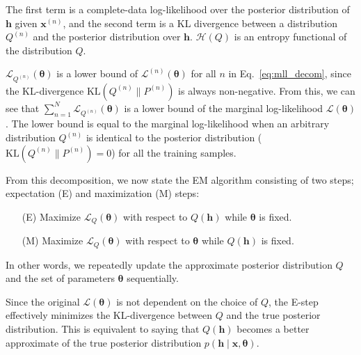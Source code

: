 \documentclass[dissertation,nocontribution]{aaltoseries}
\newcommand{\vect}[1]{\mathbf{#1}}
\newcommand{\vects}[1]{\boldsymbol{#1}}
\newcommand{\vh}[0]{\vect{h}}
\newcommand{\vx}[0]{\vect{x}}
\newcommand{\TT}[0]{{\vects{\theta}}}
\newcommand{\LL}[0]{\mathcal{L}}
\newcommand{\HH}[0]{\mathcal{H}}
\newcommand{\KL}[0]{\text{KL}}
\begin{document}
The first term is a complete-data log-likelihood over the
posterior distribution of $\vh$ given $\vx^{(n)}$, and the
second term is a KL divergence between a distribution
$Q^{(n)}$ and the posterior distribution over $\vh$.
$\HH(Q)$ is an entropy functional of the distribution $Q$.

$\LL_{Q^{(n)}}(\TT)$ is a lower bound
of $\LL^{(n)}(\TT)$ for all $n$ in Eq.~\eqref{eq:mll_decom},
since the KL-divergence $\KL(Q^{(n)}\| P^{(n)})$ is always
non-negative. From this, 
we can see that
$\sum_{n=1}^N
\LL_{Q^{(n)}}(\TT)$ is a lower bound of the marginal
log-likelihood $\LL(\TT)$. The lower bound is
equal to the marginal log-likelihood when an arbitrary
distribution $Q^{(n)}$ is identical to the posterior distribution
($\KL(Q^{(n)} \| P^{(n)}) = 0$) for all the training
samples.

From this decomposition, we now state the EM algorithm
consisting of two steps; expectation (E) and maximization
(M) steps:
\begin{enumerate}
    \itemsep 0em
    \item[(E)] Maximize $\LL_Q(\TT)$ with respect to $Q(\vh)$
        while $\TT$ is fixed.
    \item[(M)] Maximize $\LL_Q(\TT)$ with respect to $\TT$
        while $Q(\vh)$ is fixed.
\end{enumerate}
In other words, we repeatedly update the approximate
posterior distribution $Q$ and the set of parameters $\TT$
sequentially. 

Since the original $\LL(\TT)$ is not dependent on the choice
of $Q$, the E-step effectively minimizes the KL-divergence
between $Q$ and the true posterior distribution. This is
equivalent to saying that $Q(\vh)$ becomes a better
approximate of the true posterior distribution
$p(\vh\mid\vx,\TT)$.
\end{document}
